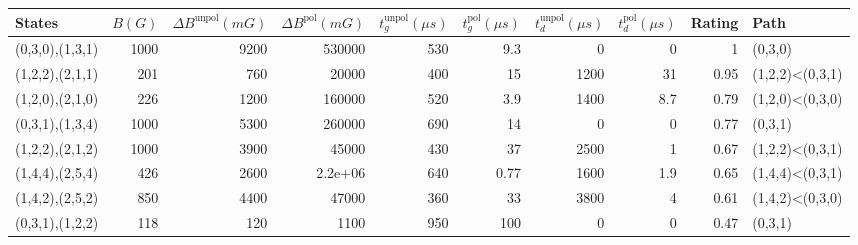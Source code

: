 \begin{tabular}{lrrrrrrrrl}
\hline
 {States}        &   {$B(G)$} &   {$\Delta B^{\text{unpol}}(mG)$} &   {$\Delta B^{\text{pol}}(mG)$} &   {$t^{\text{unpol}}_{g}(\mu s)$} &   {$t^{\text{pol}}_{g}(\mu s)$} &   {$t^{\text{unpol}}_{d}(\mu s)$} &   {$t^{\text{pol}}_{d}(\mu s)$} &   {Rating} & {Path}          \\
\hline
 (0,3,0),(1,3,1) &       1000 &                              9200 &                    530000       &                               530 &                            9.3  &                                 0 &                             0   &       1    & (0,3,0)         \\
 (1,2,2),(2,1,1) &        201 &                               760 &                     20000       &                               400 &                           15    &                              1200 &                            31   &       0.95 & (1,2,2)<(0,3,1) \\
 (1,2,0),(2,1,0) &        226 &                              1200 &                    160000       &                               520 &                            3.9  &                              1400 &                             8.7 &       0.79 & (1,2,0)<(0,3,0) \\
 (0,3,1),(1,3,4) &       1000 &                              5300 &                    260000       &                               690 &                           14    &                                 0 &                             0   &       0.77 & (0,3,1)         \\
 (1,2,2),(2,1,2) &       1000 &                              3900 &                     45000       &                               430 &                           37    &                              2500 &                             1   &       0.67 & (1,2,2)<(0,3,1) \\
 (1,4,4),(2,5,4) &        426 &                              2600 &                         2.2e+06 &                               640 &                            0.77 &                              1600 &                             1.9 &       0.65 & (1,4,4)<(0,3,1) \\
 (1,4,2),(2,5,2) &        850 &                              4400 &                     47000       &                               360 &                           33    &                              3800 &                             4   &       0.61 & (1,4,2)<(0,3,0) \\
 (0,3,1),(1,2,2) &        118 &                               120 &                      1100       &                               950 &                          100    &                                 0 &                             0   &       0.47 & (0,3,1)         \\
\hline
\end{tabular}